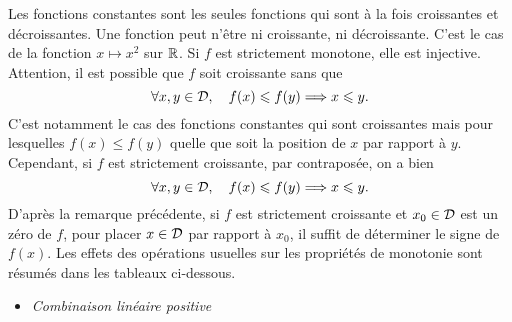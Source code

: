 \documentclass{magnolia}
\begin{document}
\begin{remarques}
\remarque Les fonctions constantes sont les seules fonctions qui sont à la fois croissantes et décroissantes.
\remarque Une fonction peut n'être ni croissante, ni décroissante. C'est le cas de la fonction $x\mapsto x^2$ sur $\mathbb{R}$.
\remarque Si $f$ est strictement monotone, elle est injective.
\remarque Attention, il est possible que $f$ soit croissante sans que
  \[\forall x,y\in\mathcal{D} ,\quad f(x)\leqslant f(y) \Longrightarrow x\leqslant y.\]
  C'est notamment le cas des fonctions constantes qui sont croissantes mais
  pour lesquelles $f(x)\leq f(y)$ quelle que soit la position de $x$ par rapport à $y$.
  Cependant, si $f$ est strictement croissante, par contraposée, on a bien
  \[\forall x,y\in\mathcal{D} ,\quad f(x)\leqslant f(y) \Longrightarrow x\leqslant y.\]
\remarque D'après la remarque précédente, si $f$ est strictement croissante et $x_0\in\mathcal{D}$ est un zéro de $f$, pour placer $x\in\mathcal{D}$ par rapport à $x_0$, il suffit de déterminer le signe de $f(x)$.
  \remarque
Les effets des opérations usuelles sur les propriétés de monotonie sont résumés
dans les tableaux ci-dessous.
\begin{itemize}
\item \emph{Combinaison linéaire positive}
  \begin{center}
  \begin{tabular}{|c|c|c|}

\end{tabular}
\end{center}
\end{itemize}
\end{remarques}
\end{document}
